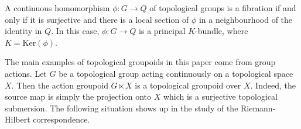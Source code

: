 \documentclass[10pt]{amsart}
\numberwithin{theoremalpha}{section}
\numberwithin{equation}{section}
\numberwithin{definition}{section}
\numberwithin{theorem}{section}
\numberwithin{proposition}{section}
\numberwithin{lemma}{section}
\numberwithin{example}{section}
\numberwithin{remark}{section}
\numberwithin{corollary}{section}
\numberwithin{question}{section}
\numberwithin{problem}{section}
\numberwithin{assumption}{section}
\theoremstyle{named}
\numberwithin{equation}{section}
\begin{document}
\begin{lemma} \label{continuoushomsub}
A continuous homomorphism $\phi: G \to Q$ of topological groups is a fibration if and only if it is surjective and there is a local section of $\phi$ in a neighbourhood of the identity in $Q$. In this case, $\phi : G \to Q$ is a principal $K$-bundle, where $K = \mathrm{Ker}(\phi)$. 
\end{lemma}

The main examples of topological groupoids in this paper come from group actions. Let $G$ be a topological group acting continuously on a topological space $X$. Then the action groupoid $G \ltimes X$ is a topological groupoid over $X$. Indeed, the source map is simply the projection onto $X$ which is a surjective topological submersion. The following situation shows up in the study of the Riemann-Hilbert correspondence. 
\end{document}
